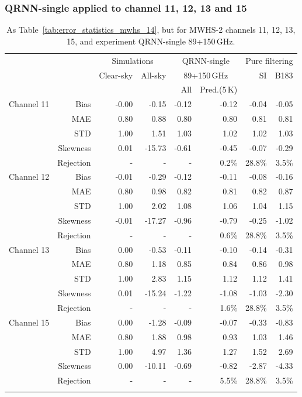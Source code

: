 \documentclass[amt, manuscript]{copernicus}
\begin{document}
\subsubsection{QRNN-single applied to channel 11, 12, 13 and 15}
\label{sec:mwhs_others}
\begin{table}[t]
	\caption{ As Table~\ref{tab:error_statistics_mwhs_14}, but for MWHS-2 channels 11, 12, 13, 15, and experiment QRNN-single 89+150\,GHz.}
	\label{tab:error_statistics_mwhs_others}
	\begin{tabular}{lrrr|rr|rr}
		\tophline
		&&\multicolumn{2}{c|}{Simulations}& \multicolumn{2}{c|}{QRNN-single} & \multicolumn{2}{c}{Pure filtering} \\
		\cline{2-8}
		& &  Clear-sky &   All-sky &  \multicolumn{2}{c|}{89+150\,GHz}    & SI & B183  \\
		&	&		   &			& All & Pred.(5\,K) &&\\
		\middlehline
		Channel 11  & Bias     & -0.00 &  -0.15 & -0.12 & -0.12 & -0.04 & -0.05\\
					& MAE      &  0.80 &   0.88 &  0.80 &  0.80 &  0.81 & 0.81 \\
					& STD      &  1.00 &   1.51 &  1.03 &  1.02 &  1.02 & 1.03 \\
					& Skewness &  0.01 & -15.73 & -0.61 & -0.45 & -0.07 & -0.29\\
					& Rejection   & -    & -      & -	  & 0.2\% & 28.8\% & 3.5\%  \\
		\middlehline
		Channel 12  &  Bias     & -0.01 &  -0.29 & -0.12 & -0.11  & -0.08 & -0.16\\
					&  MAE      &  0.80 &   0.98 &  0.82 &  0.81  &  0.82 & 0.87\\
					&  STD      &  1.00 &   2.02 &  1.08 &  1.06  &  1.04 & 1.15\\
					&  Skewness & -0.01 & -17.27 & -0.96 & -0.79  &  -0.25 & -1.02 \\
					& Rejection & -     & -      & -	 & 0.6\%  & 28.8\% & 3.5\%  \\
		\middlehline
		Channel 13  &Bias       & 0.00 &  -0.53 & -0.11 & -0.10 & -0.14 & -0.31\\
					&MAE        & 0.80 &   1.18 &  0.85 &  0.84 &  0.86 & 0.98\\
					&STD        & 1.00 &   2.83 &  1.15 &  1.12 &  1.12 & 1.41 \\
					&Skewness   & 0.01 & -15.24 & -1.22 & -1.08 & -1.03 & -2.30\\  	
					& Rejection & -     & -      & -	 & 1.6\%& 28.8\% & 3.5\%  \\	
		\middlehline
		Channel 15  &  Bias     & 0.00 &  -1.28 & -0.09 & -0.07 & -0.33 & -0.83\\
					&  MAE      & 0.80 &   1.88 &  0.98 &  0.93 &  1.03 &  1.46\\
					&  STD      & 1.00 &   4.97 &  1.36 &  1.27 &  1.52 &  2.69\\
					&  Skewness & 0.00 & -10.11 & -0.69 & -0.82 & -2.87 &  -4.33 \\ 
					& Rejection & -     & -      & -	 & 5.5\% & 28.8\%& 3.5\%  \\
		\bottomhline
	\end{tabular}
\end{table}
\end{document}
